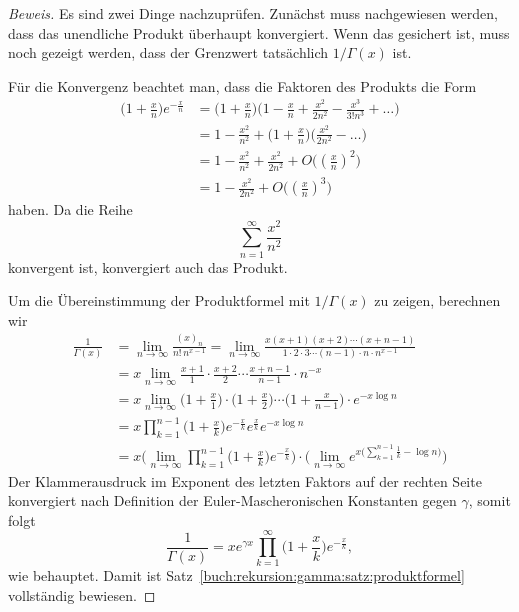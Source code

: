 \begin{proof}[Beweis]
Es sind zwei Dinge nachzuprüfen.
Zunächst muss nachgewiesen werden, dass das unendliche Produkt 
überhaupt konvergiert.
Wenn das gesichert ist, muss noch gezeigt werden, dass der Grenzwert
tatsächlich $1/\Gamma(x)$ ist.

Für die Konvergenz beachtet man, dass die Faktoren des Produkts 
die Form
\begin{align*}
\biggl(1+\frac{x}n\biggr)e^{-\frac{x}{n}}
&=
\biggl(1+\frac{x}n\biggr)
\biggl(1-\frac{x}{n}+\frac{x^2}{2n^2}-\frac{x^3}{3!n^3}+\dots\biggr)
\\
&=
1-\frac{x^2}{n^2} + 
\biggl(1+\frac{x}n\biggr)
\biggl(\frac{x^2}{2n^2}-\dots\biggr)
\\
&=
1-\frac{x^2}{n^2} + \frac{x^2}{2n^2} + O\bigl((\textstyle\frac{x}{n})^2\bigr)
\\
&=
1-\frac{x^2}{2n^2} + O\bigl((\textstyle\frac{x}{n})^3\bigr)
\end{align*}
haben.
Da die Reihe 
\[
\sum_{n=1}^\infty \frac{x^2}{n^2}
\]
konvergent ist, konvergiert auch das Produkt.

Um die Übereinstimmung der Produktformel mit $1/\Gamma(x)$ zu zeigen,
berechnen wir
\begin{align*}
\frac{1}{\Gamma(x)}
&=
\lim_{n\to\infty} 
\frac{(x)_n}{n!\,n^{x-1}}
=
\lim_{n\to\infty} 
\frac{x(x+1)(x+2)\cdots(x+n-1)}{1\cdot 2\cdot3\cdots (n-1)\cdot n\cdot n^{x-1}}
\\
&=
x
\lim_{n\to\infty} 
\frac{x+1}{1}
\cdot
\frac{x+2}{2}
\cdots
\frac{x+n-1}{n-1}
\cdot
n^{-x}
\\
&=
x
\lim_{n\to\infty}
\biggl(1+\frac{x}{1}\biggr)
\cdot
\biggl(1+\frac{x}{2}\biggr)
\cdots
\biggl(1+\frac{x}{n-1}\biggr)
\cdot
e^{-x\log n}
\\
&=
x
\prod_{k=1}^{n-1}
\biggl(1+\frac{x}{k}\biggr)
e^{-\frac{x}{k}}
e^{\frac{x}{k}}
e^{-x\log n}
\\
&=
x
\biggl(
\lim_{n\to\infty}
\prod_{k=1}^{n-1}
\biggl(1+\frac{x}{k}\biggr)
e^{-\frac{x}{k}}
\biggr)
\cdot
\biggl(
\lim_{n\to\infty}
e^{x\bigl(\sum_{k=1}^{n-1}\frac{1}{k} - \log n\bigr)}
\biggr)
\end{align*}
Der Klammerausdruck im Exponent des letzten Faktors auf der rechten Seite
konvergiert nach Definition der Euler-Mascheronischen Konstanten gegen
$\gamma$, somit folgt 
\[
\frac{1}{\Gamma(x)}
=
xe^{\gamma x}\prod_{k=1}^\infty \biggl(1+\frac{x}{k}\biggr)e^{-\frac{x}{k}},
\]
wie behauptet.
Damit ist Satz~\ref{buch:rekursion:gamma:satz:produktformel}
vollständig bewiesen.
\end{proof}

